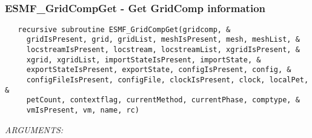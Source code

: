  
\mbox{}\hrulefill\ 
 
\subsubsection [ESMF\_GridCompGet] {ESMF\_GridCompGet - Get GridComp information}


  
\begin{verbatim}   recursive subroutine ESMF_GridCompGet(gridcomp, &
     gridIsPresent, grid, gridList, meshIsPresent, mesh, meshList, &
     locstreamIsPresent, locstream, locstreamList, xgridIsPresent, &
     xgrid, xgridList, importStateIsPresent, importState, &
     exportStateIsPresent, exportState, configIsPresent, config, &
     configFileIsPresent, configFile, clockIsPresent, clock, localPet, &
     petCount, contextflag, currentMethod, currentPhase, comptype, &
     vmIsPresent, vm, name, rc)\end{verbatim}{\em ARGUMENTS:}
